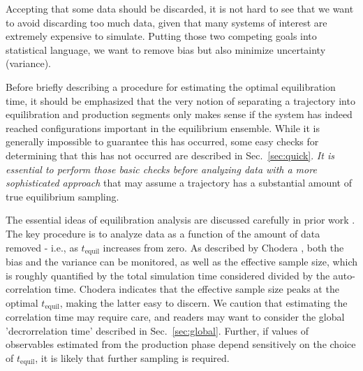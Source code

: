 Accepting that some data should be discarded, it is not hard to see that we want to avoid discarding too much data, given that many systems of interest are extremely expensive to simulate.
Putting those two competing goals into statistical language, we want to remove bias but also minimize uncertainty (variance).

Before briefly describing a procedure for estimating the optimal equilibration time, it should be emphasized that the very notion of separating a trajectory into equilibration and production segments
only makes sense if the system has indeed reached configurations important in the equilibrium ensemble.
While it is generally impossible to guarantee this has occurred, some easy checks for determining that this has not occurred are described in Sec.\ \ref{sec:quick}.
\emph{It is essential to perform those basic checks before analyzing data with a more sophisticated approach} that may assume a trajectory has a substantial amount of true equilibrium sampling.

The essential ideas of equilibration analysis are discussed carefully in prior work \cite{Yang2004,Chodera-2016}.
The key procedure is to analyze data as a function of the amount of data removed - i.e., as $t_{\mathrm{equil}}$ increases from zero.
As described by Chodera \cite{Chodera-2016}, both the bias and the variance can be monitored, as well as the effective sample size, which is roughly quantified by the total simulation time considered divided by the auto-correlation time.
Chodera indicates that the effective sample size peaks at the optimal $t_{\mathrm{equil}}$, making the latter easy to discern.
We caution that estimating the correlation time may require care, and readers may want to consider the global 'decrorrelation time' \cite{Lyman2007a} described in Sec.\ \ref{sec:global}.
Further, if values of observables estimated from the production phase depend sensitively on the choice of $t_{\mathrm{equil}}$, it is likely that further sampling is required.
